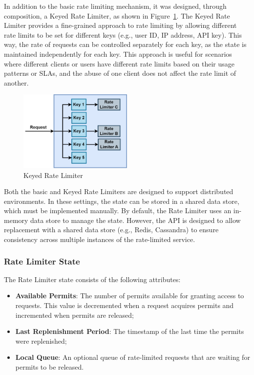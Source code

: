 In addition to the basic rate limiting mechanism, it was designed, through composition, a Keyed Rate Limiter, as shown in Figure~\ref{fig:keyed-rate-limiter}.
The Keyed Rate Limiter provides a fine-grained approach to rate limiting
by allowing different rate limits to be set for different keys
(e.g., user ID, IP address, API key).
This way, the rate of requests can be controlled separately for each key, as the state is maintained
independently for each key.
This approach is useful for scenarios
where different clients or users have different rate limits based on their usage patterns or SLAs,
and the abuse of one client does not affect the rate limit of another.

\begin{figure}[!htb]
    \centering
    \includegraphics[width=0.5\textwidth]{../figures/06_keyed-rate-limiter}
    \caption{Keyed Rate Limiter}
    \label{fig:keyed-rate-limiter}
\end{figure}

Both the basic and Keyed Rate Limiters are designed to support distributed environments.
In these settings, the state can be stored in a shared data store,
which must be implemented manually.
By default, the Rate Limiter uses an in-memory data store to manage the state.
However,
the API is designed to allow replacement with a shared data store
(e.g., Redis, Cassandra) to ensure consistency across multiple instances of the rate-limited service.

\subsubsection{Rate Limiter State}\label{subsubsec:rate-limiter-state}

The Rate Limiter state consists of the following attributes:

\begin{itemize}
    \item \textbf{Available Permits}: The number of permits available for granting access to requests.
    This value is decremented when a request acquires permits and incremented when permits are released;
    \item \textbf{Last Replenishment Period}: The timestamp of the last time the permits were replenished;
    \item \textbf{Local Queue}: An optional queue of rate-limited requests that are waiting for permits to be released.
\end{itemize}

